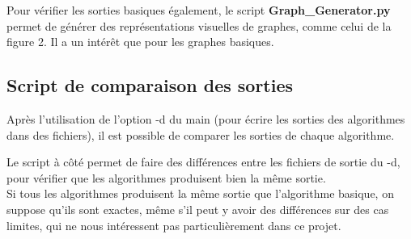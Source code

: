 \documentclass[a4paper,11pt]{article}
\begin{document}
Pour vérifier les sorties basiques également, le script \textbf{Graph\_Generator.py} permet de générer des représentations visuelles de graphes, comme celui de la figure 2. Il a un intérêt que pour les graphes basiques.

\subsection{Script de comparaison des sorties}

Après l'utilisation de l'option -d du main (pour écrire les sorties des algorithmes dans des fichiers), il est possible de comparer les sorties de chaque algorithme.

\begin{minipage}{0.35\linewidth}
Le script à côté permet de faire des différences entre les fichiers de sortie du -d, pour vérifier que les algorithmes produisent bien la même sortie.\\

Si tous les algorithmes produisent la même sortie que l'algorithme basique, on suppose qu'ils sont exactes, même s'il peut y avoir des différences sur des cas limites, qui ne nous intéressent pas particulièrement dans ce projet.

\end{minipage}\hfill
\end{document}
